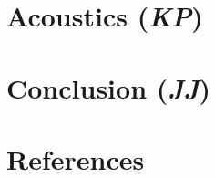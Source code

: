 \documentclass[conf]{new-aiaa}
\begin{document}
\clearpage
\section{Acoustics (\textit{KP})}    
\label{section: Acoustics}



\clearpage
\section{Conclusion (\textit{JJ})}
\label{section: Conclusion}



\label{section: Requirements}


\newpage
\section{References}

\end{document}
